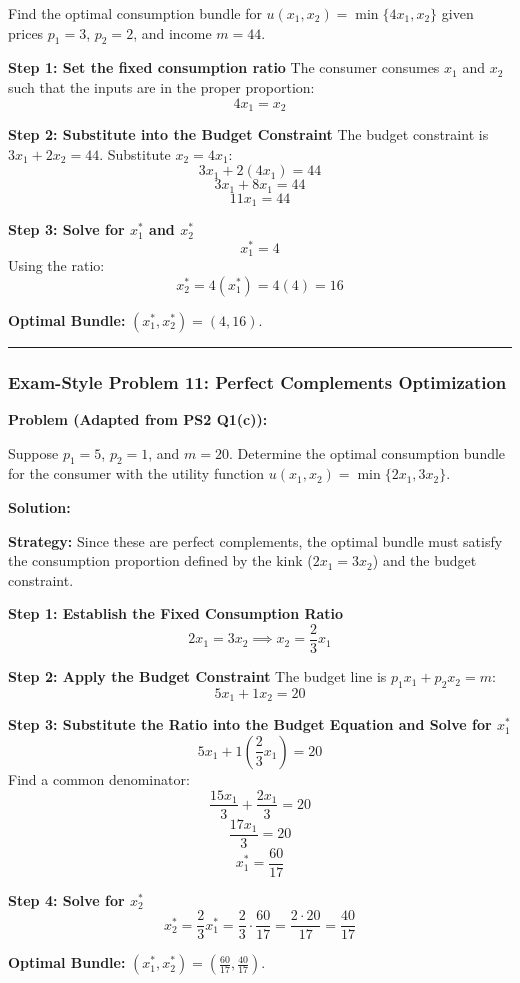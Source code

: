 \documentclass{article}
\begin{document}
Find the optimal consumption bundle for $u(x_1, x_2) = \min\{4x_1, x_2\}$ given prices $p_1=3$, $p_2=2$, and income $m=44$.

\textbf{Step 1: Set the fixed consumption ratio}
The consumer consumes $x_1$ and $x_2$ such that the inputs are in the proper proportion:
\[ 4x_1 = x_2 \]

\textbf{Step 2: Substitute into the Budget Constraint}
The budget constraint is $3x_1 + 2x_2 = 44$. Substitute $x_2 = 4x_1$:
\[ 3x_1 + 2(4x_1) = 44 \]
\[ 3x_1 + 8x_1 = 44 \]
\[ 11x_1 = 44 \]

\textbf{Step 3: Solve for $x_1^*$ and $x_2^*$}
\[ x_1^* = 4 \]
Using the ratio:
\[ x_2^* = 4(x_1^*) = 4(4) = 16 \]

\textbf{Optimal Bundle:} $(x_1^*, x_2^*) = (4, 16)$.

\medskip\noindent\rule{\linewidth}{0.4pt}\medskip

\subsubsection*{Exam-Style Problem 11: Perfect Complements Optimization}

\textbf{Problem (Adapted from PS2 Q1(c)):}

Suppose $p_1 = 5$, $p_2 = 1$, and $m = 20$. Determine the optimal consumption bundle for the consumer with the utility function $u(x_1, x_2) = \min\{2x_1, 3x_2\}$.

\textbf{Solution:}

\textbf{Strategy:} Since these are perfect complements, the optimal bundle must satisfy the consumption proportion defined by the kink ($2x_1 = 3x_2$) and the budget constraint.

\textbf{Step 1: Establish the Fixed Consumption Ratio}
\[ 2x_1 = 3x_2 \implies x_2 = \frac{2}{3} x_1 \]

\textbf{Step 2: Apply the Budget Constraint}
The budget line is $p_1 x_1 + p_2 x_2 = m$:
\[ 5x_1 + 1x_2 = 20 \]

\textbf{Step 3: Substitute the Ratio into the Budget Equation and Solve for $x_1^*$}
\[ 5x_1 + 1\left(\frac{2}{3} x_1\right) = 20 \]
Find a common denominator:
\[ \frac{15x_1}{3} + \frac{2x_1}{3} = 20 \]
\[ \frac{17x_1}{3} = 20 \]
\[ x_1^* = \frac{60}{17} \]

\textbf{Step 4: Solve for $x_2^*$}
\[ x_2^* = \frac{2}{3} x_1^* = \frac{2}{3} \cdot \frac{60}{17} = \frac{2 \cdot 20}{17} = \frac{40}{17} \]

\textbf{Optimal Bundle:} $(x_1^*, x_2^*) = \left(\frac{60}{17}, \frac{40}{17}\right)$.
\end{document}
